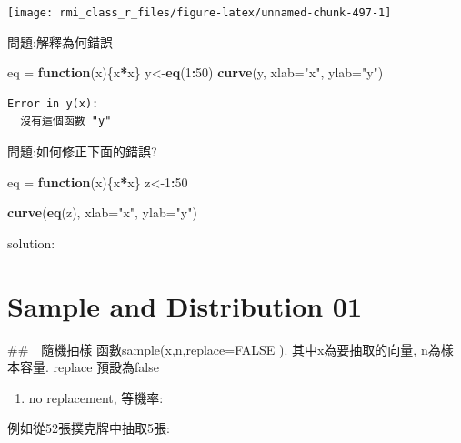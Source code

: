 \documentclass[]{book}
\newenvironment{Shaded}{\begin{snugshade}}{\end{snugshade}}
\newcommand{\ControlFlowTok}[1]{\textcolor[rgb]{0.13,0.29,0.53}{\textbf{#1}}}
\newcommand{\DataTypeTok}[1]{\textcolor[rgb]{0.13,0.29,0.53}{#1}}
\newcommand{\DecValTok}[1]{\textcolor[rgb]{0.00,0.00,0.81}{#1}}
\newcommand{\KeywordTok}[1]{\textcolor[rgb]{0.13,0.29,0.53}{\textbf{#1}}}
\newcommand{\NormalTok}[1]{#1}
\newcommand{\OperatorTok}[1]{\textcolor[rgb]{0.81,0.36,0.00}{\textbf{#1}}}
\newcommand{\StringTok}[1]{\textcolor[rgb]{0.31,0.60,0.02}{#1}}
\providecommand{\tightlist}{%
  \setlength{\itemsep}{0pt}\setlength{\parskip}{0pt}}
\theoremstyle{definition}
\theoremstyle{definition}
\theoremstyle{definition}
\theoremstyle{remark}
\begin{document}
\begin{center}\texttt{[image: rmi\_class\_r\_files/figure-latex/unnamed-chunk-497-1]} \end{center}

問題:解釋為何錯誤

\begin{Shaded}
\begin{Highlighting}[]
\NormalTok{eq =}\StringTok{ }\ControlFlowTok{function}\NormalTok{(x)\{x}\OperatorTok{*}\NormalTok{x\}}
\NormalTok{y<-}\KeywordTok{eq}\NormalTok{(}\DecValTok{1}\OperatorTok{:}\DecValTok{50}\NormalTok{)}
\KeywordTok{curve}\NormalTok{(y, }\DataTypeTok{xlab=}\StringTok{"x"}\NormalTok{, }\DataTypeTok{ylab=}\StringTok{"y"}\NormalTok{)}
\end{Highlighting}
\end{Shaded}

\begin{verbatim}
Error in y(x):
  沒有這個函數 "y"
\end{verbatim}

問題:如何修正下面的錯誤?

\begin{Shaded}
\begin{Highlighting}[]
\NormalTok{eq =}\StringTok{ }\ControlFlowTok{function}\NormalTok{(x)\{x}\OperatorTok{*}\NormalTok{x\}}
\NormalTok{z<-}\DecValTok{1}\OperatorTok{:}\DecValTok{50}

\KeywordTok{curve}\NormalTok{(}\KeywordTok{eq}\NormalTok{(z), }\DataTypeTok{xlab=}\StringTok{"x"}\NormalTok{, }\DataTypeTok{ylab=}\StringTok{"y"}\NormalTok{)}
\end{Highlighting}
\end{Shaded}

solution:

\hypertarget{sample-and-distribution-01}{%
\chapter{Sample and Distribution 01}\label{sample-and-distribution-01}}

\#\#　隨機抽樣 函數sample(x,n,replace=FALSE ). 其中x為要抽取的向量,
n為樣本容量. replace 預設為false

\begin{enumerate}
\def\labelenumi{\arabic{enumi}.}
\tightlist
\item
  no replacement, 等機率:
\end{enumerate}

例如從52張撲克牌中抽取5張:
\end{document}
